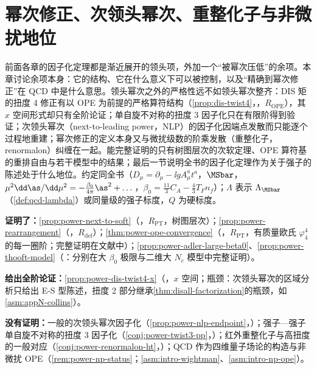 \chapter{幂次修正、次领头幂次、重整化子与非微扰地位}\label{ch:power}

前面各章的因子化定理都是渐近展开的领头项，外加一个“被幂次压低”的余项。本章讨论余项本身：它的结构、它在什么意义下可以被控制，以及“精确到幂次修正”在 QCD 中是什么意思。领头幂次之外的严格性远不如领头幂次整齐：DIS 矩的扭度 4 修正有以 OPE 为前提的严格算符结构（\cref{prop:dis-twist4}，\tagR，$R_{\mathrm{OPE}}$），其 $x$ 空间形式却只有全阶论证；单自旋不对称的扭度 3 因子化只在有限阶得到验证；次领头幂次（next-to-leading power，NLP）的因子化因端点发散而只能逐个过程地重建；幂次修正的定义本身又与微扰级数的阶乘发散（重整化子，renormalon）纠缠在一起。能完整证明的只有树图层次的次软定理、OPE 算符基的重排自由与若干模型中的结果；最后一节说明全书的因子化定理作为关于强子的陈述处于什么地位。约定同全书（$D_\mu=\partial_\mu-\ii gA^a_\mu t^a$，$\MSbar$，$\mu^2\dd\as/\dd\mu^2=-\frac{\beta_0}{4\pi}\as^2+\dots$，$\beta_0=\frac{11}{3}C_A-\frac43T_Fn_f$）；$\Lambda$ 表示 $\Lambda_{\MSbar}$（\cref{def:qcd-lambda}）或同量级的强子标度，$Q$ 为硬标度。

\begin{tcolorbox}[enhanced,breakable,title=本章证明了什么／没有证明什么,fonttitle=\bfseries,
  colback=gray!3!white,colframe=gray!55!black,boxrule=0.6pt,arc=2pt,
  left=5pt,right=5pt,top=3pt,bottom=3pt,before skip=6pt,after skip=6pt]
\textbf{证明了：}\cref{prop:power-next-to-soft}（\tagR，$R_{\mathrm{PT}}$，树图层次）；\cref{prop:power-rearrangement}（\tagR，$R_{\mathrm{def}}$）；\cref{thm:power-ope-convergence}（\tagR，$R_{\mathrm{PT}}$，有质量欧氏 $\varphi^4_4$ 的每一圈阶；完整证明在文献中）；\cref{prop:power-adler-large-beta0}、\cref{prop:power-thooft-model}（\tagP：分别在大 $\beta_0$ 极限与二维大 $N_c$ 模型中完整证明）。\par
\textbf{给出全阶论证：}\cref{prop:power-dis-twist4-x}（\tagA，$x$ 空间；瓶颈：次领头幂次的区域分析只给出 E-S 型陈述，扭度 2 部分继承\cref{thm:disall-factorization}的瓶颈，如\cref{asm:appN-collins}）。\par
\textbf{没有证明：}一般的次领头幂次因子化（\cref{prop:power-nlp-endpoint}，\tagP）；强子—强子单自旋不对称的扭度 3 因子化（\cref{conj:power-twist3-pp}，\tagC）；红外重整化子与高扭度的一般对应（\cref{conj:power-renormalon-ht}，\tagC）；QCD 作为四维量子场论的构造与非微扰 OPE（\cref{rem:power-np-status}；\cref{asm:intro-wightman}、\cref{asm:intro-np-ope}）。
\end{tcolorbox}

